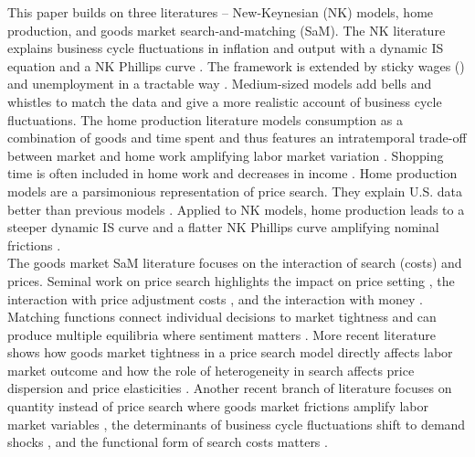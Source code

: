 \documentclass[12pt,3p,authoryear,review]{elsarticle}
\begin{document}
This paper builds on three literatures -- New-Keynesian (NK) models, home production, and goods market search-and-matching (SaM). The NK literature explains business cycle fluctuations in inflation and output with a dynamic IS equation and a NK Phillips curve \citep{yun1996nominal}. The framework is extended by sticky wages (\cite{ercegOptimalMonetaryPolicy2000}) and unemployment in a tractable way \citep{gali2011unemployment}. Medium-sized models \citep{christianoNominalRigiditiesDynamic2005,christianoDSGEModelsMonetary2010} add bells and whistles to match the data and give a more realistic account of business cycle fluctuations. The home production literature models consumption as a combination of goods and time spent \citep{becker1965theory} and thus features an intratemporal trade-off between market and home work amplifying labor market variation \citep{benhabibHomeworkMacroeconomicsHousehold1991,greenwoodAllocationCapitalTime1991}. Shopping time is often included in home work and decreases in income \citep{aguiar2013time}. Home production models are a parsimonious representation of price search. They explain U.S. data better than previous models \citep{mcgrattan1997equilibrium}. Applied to NK models, home production leads to a steeper dynamic IS curve and a flatter NK Phillips curve amplifying nominal frictions \citep{gnocchiHouseworkFiscalExpansions2016,lesterHomeProductionSticky2014,safonova2017home}.\\%
The goods market SaM literature focuses on the interaction of search (costs) and prices. Seminal work on price search highlights the impact on price setting \citep{burdett1983equilibrium,diamondModelPriceAdjustment1971,diamondSearchStickyPrices1993}, the interaction with price adjustment costs \citep{benabou1988search,benabou1992inflation}, and the interaction with money \citep{diamond1984money,kiyotaki1993search,lagos2005unified,rocheteau2005money,shi1997divisible,shi1998search}. Matching functions connect individual decisions to market tightness and can produce multiple equilibria where sentiment matters \citep{diamond1982aggregate,diamond1989rational}. More recent literature shows how goods market tightness in a price search model directly affects labor market outcome \citep{kaplanShoppingExternalitiesSelffulfilling2016} and how the role of heterogeneity in search affects price dispersion and price elasticities \citep{nord2023shopping,pytka2024shopping}. Another recent branch of literature focuses on quantity instead of price search where goods market frictions amplify labor market variables \citep{lehmann2010search,michaillatAggregateDemandIdle2015,petrosky-nadeauMacroeconomicDynamicsModel2015,petrosky2021hosios}, the determinants of business cycle fluctuations shift to demand shocks \citep{bai2025demand}, and the functional form of search costs matters \citep{mathaSearchProductMarket2011}. 
\end{document}
